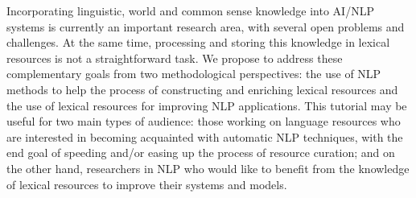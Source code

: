 Incorporating linguistic, world and common sense knowledge into AI/NLP systems is currently an important research area, with several open problems and challenges. At the same time, processing and storing this knowledge in lexical resources is not a straightforward task. We propose to address these complementary goals from two methodological perspectives: the use of NLP methods to help the process of constructing and enriching lexical resources and the use of lexical resources for improving NLP applications. This tutorial may be useful for two main types of audience: those working on language resources who are interested in becoming acquainted with automatic NLP techniques, with the end goal of speeding and/or easing up the process of resource curation; and on the other hand, researchers in NLP who would like to benefit from the knowledge of lexical resources to improve their systems and models.

